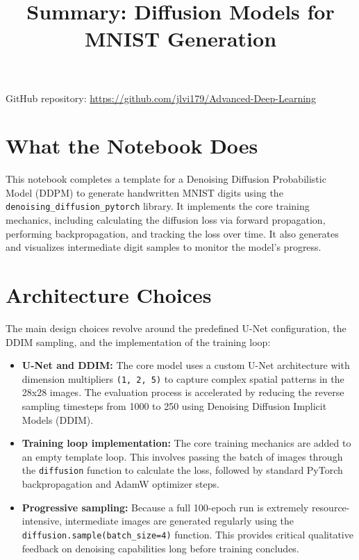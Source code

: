 \documentclass[11pt,a4paper]{article}
\title{Summary: Diffusion Models for MNIST Generation}
\author{}
\date{}
\begin{document}
\maketitle

\noindent GitHub repository: \href{https://github.com/jlvi179/Advanced-Deep-Learning}{https://github.com/jlvi179/Advanced-Deep-Learning}

\section*{What the Notebook Does}

This notebook completes a template for a Denoising Diffusion Probabilistic Model (DDPM) to generate handwritten MNIST digits using the \texttt{denoising\_diffusion\_pytorch} library. It implements the core training mechanics, including calculating the diffusion loss via forward propagation, performing backpropagation, and tracking the loss over time. It also generates and visualizes intermediate digit samples to monitor the model's progress.

\section*{Architecture Choices}

The main design choices revolve around the predefined U-Net configuration, the DDIM sampling, and the implementation of the training loop:

\begin{itemize}
    \item \textbf{U-Net and DDIM:} The core model uses a custom U-Net architecture with dimension multipliers \texttt{(1, 2, 5)} to capture complex spatial patterns in the 28x28 images. The evaluation process is accelerated by reducing the reverse sampling timesteps from 1000 to 250 using Denoising Diffusion Implicit Models (DDIM).
    \item \textbf{Training loop implementation:} The core training mechanics are added to an empty template loop. This involves passing the batch of images through the \texttt{diffusion} function to calculate the loss, followed by standard PyTorch backpropagation and AdamW optimizer steps.
\end{itemize}

\begin{itemize}
    \item \textbf{Progressive sampling:} Because a full 100-epoch run is extremely resource-intensive, intermediate images are generated regularly using the \texttt{diffusion.sample(batch\_size=4)} function. This provides critical qualitative feedback on denoising capabilities long before training concludes.
\end{itemize}
\end{document}

